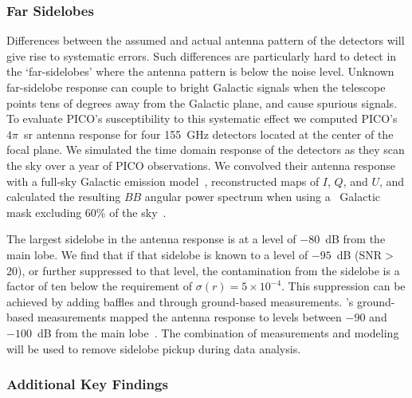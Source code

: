 \documentclass[PICOReport.tex]{subfiles}
\begin{document}
\subsubsection{Far Sidelobes}
\label{sec:fsl}

Differences between the assumed and actual antenna pattern of the detectors will give rise to systematic errors. Such differences are particularly hard to detect in the `far-sidelobes' where the antenna pattern is below the noise level. Unknown far-sidelobe response can couple to bright Galactic signals when the telescope points tens of degrees away from the Galactic plane, and cause spurious signals. To evaluate PICO's susceptibility to this systematic effect we 
computed PICO's $4\pi$~sr antenna response for four 155~GHz detectors located at the center of the focal plane. We simulated the time domain response of the detectors as they scan the sky over a year of PICO observations. We convolved their antenna response with a full-sky Galactic emission model~\citep{thorne2018_pysm}, reconstructed maps of $I$, $Q$, and $U$, and calculated the resulting $BB$ angular power spectrum when using a \planck\ Galactic mask excluding 60\% of the sky~\citep{planck_2013_xv}. 

The largest sidelobe in the antenna response is at a level of $-80$~dB from the main lobe. We find that if that sidelobe is known to a level of $-95$~dB (\ac{SNR}$>$20), or further suppressed to that level, the contamination from the sidelobe is a factor of ten below the requirement of $\sigma(r) = 5 \times 10^{-4}$. This suppression can be achieved by adding baffles and through ground-based measurements. \planck 's ground-based measurements mapped the antenna response to levels between $-90$ and $-100$~dB from the main lobe~\citep{planck_sidelobes_IEEE}. The combination of measurements and modeling will be used to remove sidelobe pickup during data analysis. 
 

\subsubsection{Additional Key Findings}
\label{sec:systematics_key}
\end{document}
